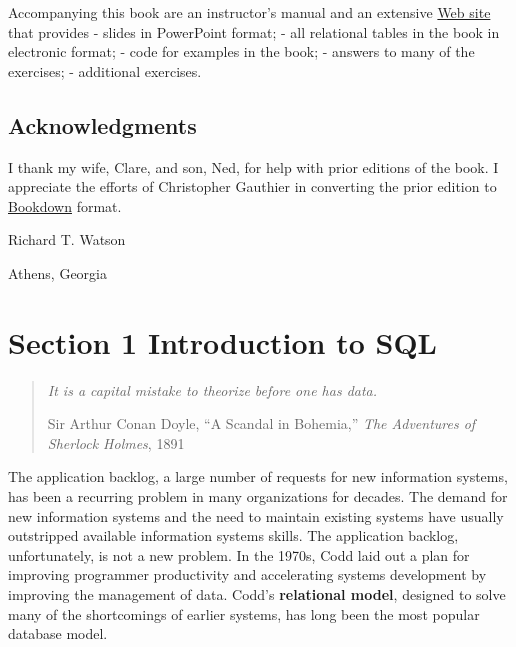 \documentclass[
]{article}
\begin{document}
Accompanying this book are an instructor's manual and an extensive
\href{https://www.richardtwatson.com/open/}{Web site} that provides -
slides in PowerPoint format; - all relational tables in the book in
electronic format; - code for examples in the book; - answers to many of
the exercises; - additional exercises.

\hypertarget{acknowledgments}{%
\subsection*{Acknowledgments}\label{acknowledgments}}

I thank my wife, Clare, and son, Ned, for help with prior editions of
the book. I appreciate the efforts of Christopher Gauthier in converting
the prior edition to \href{https://bookdown.org}{Bookdown} format.

Richard T. Watson

Athens, Georgia

\newpage
\setcounter{tocdepth}{2}
\tableofcontents
\newpage

\hypertarget{section-1-introduction-to-sql}{%
\section*{Section 1 Introduction to
SQL}\label{section-1-introduction-to-sql}}

\begin{quote}
\emph{It is a capital mistake to theorize before one has data.}

Sir Arthur Conan Doyle, ``A Scandal in Bohemia,'' \emph{The Adventures
of Sherlock Holmes}, 1891
\end{quote}

The application backlog, a large number of requests for new information
systems, has been a recurring problem in many organizations for decades.
The demand for new information systems and the need to maintain existing
systems have usually outstripped available information systems skills.
The application backlog, unfortunately, is not a new problem. In the
1970s, Codd laid out a plan for improving programmer productivity and
accelerating systems development by improving the management of data.
Codd's \textbf{relational model}, designed to solve many of the
shortcomings of earlier systems, has long been the most popular database
model.
\end{document}

